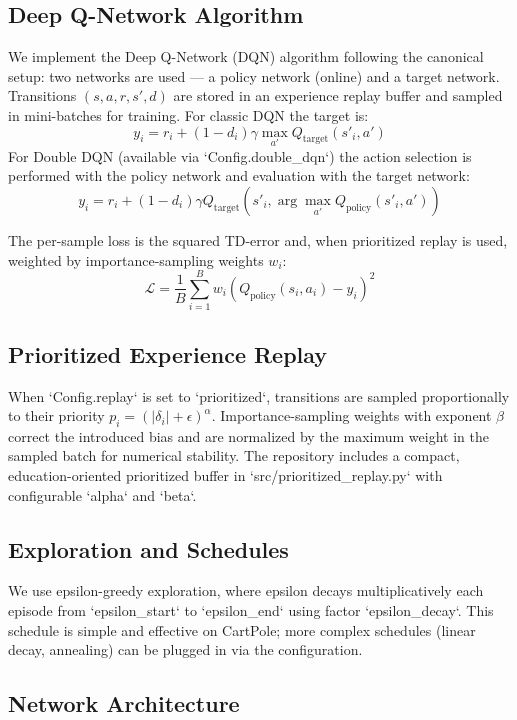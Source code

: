 \documentclass{IEEEtran}
\begin{document}
\subsection{Deep Q-Network Algorithm}

We implement the Deep Q-Network (DQN) algorithm following the canonical setup: two networks are used — a policy network (online) and a target network. Transitions $(s,a,r,s',d)$ are stored in an experience replay buffer and sampled in mini-batches for training. For classic DQN the target is:
\[
y_i = r_i + (1 - d_i) \gamma \max_{a'} Q_{\text{target}}(s'_i, a')
\]
For Double DQN (available via `Config.double_dqn`) the action selection is performed with the policy network and evaluation with the target network:
\[
y_i = r_i + (1 - d_i) \gamma Q_{\text{target}}(s'_i, \arg\max_{a'} Q_{\text{policy}}(s'_i, a'))
\]

The per-sample loss is the squared TD-error and, when prioritized replay is used, weighted by importance-sampling weights $w_i$:
\[
\mathcal{L} = \frac{1}{B} \sum_{i=1}^B w_i \left( Q_{\text{policy}}(s_i,a_i) - y_i \right)^2
\]

\subsection{Prioritized Experience Replay}

When `Config.replay` is set to `prioritized`, transitions are sampled proportionally to their priority $p_i = (|\delta_i| + \epsilon)^{\alpha}$. Importance-sampling weights with exponent $\beta$ correct the introduced bias and are normalized by the maximum weight in the sampled batch for numerical stability. The repository includes a compact, education-oriented prioritized buffer in `src/prioritized_replay.py` with configurable `alpha` and `beta`.

\subsection{Exploration and Schedules}

We use epsilon-greedy exploration, where epsilon decays multiplicatively each episode from `epsilon_start` to `epsilon_end` using factor `epsilon_decay`. This schedule is simple and effective on CartPole; more complex schedules (linear decay, annealing) can be plugged in via the configuration.

\subsection{Network Architecture}
\end{document}
